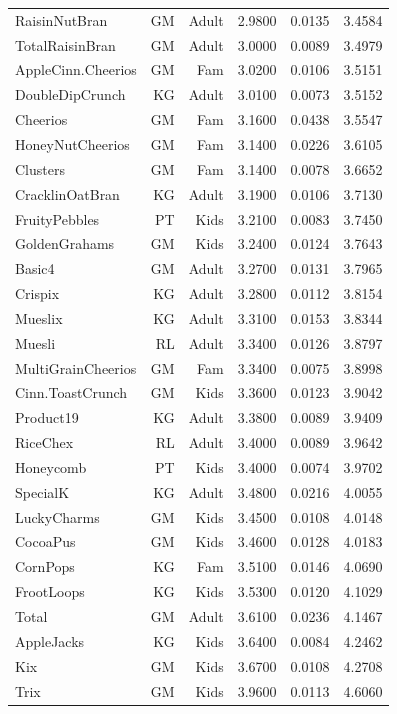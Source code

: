 \begin{longtable}{@{}lrrrrr@{}}
RaisinNutBran & GM & Adult & 2.9800 & 0.0135 & 3.4584 \\
TotalRaisinBran & GM & Adult & 3.0000 & 0.0089 & 3.4979 \\
AppleCinn.Cheerios & GM & Fam & 3.0200 & 0.0106 & 3.5151 \\
DoubleDipCrunch & KG & Adult & 3.0100 & 0.0073 & 3.5152 \\
Cheerios & GM & Fam & 3.1600 & 0.0438 & 3.5547 \\
HoneyNutCheerios & GM & Fam & 3.1400 & 0.0226 & 3.6105 \\
Clusters & GM & Fam & 3.1400 & 0.0078 & 3.6652 \\
CracklinOatBran & KG & Adult & 3.1900 & 0.0106 & 3.7130 \\
FruityPebbles & PT & Kids & 3.2100 & 0.0083 & 3.7450 \\
GoldenGrahams & GM & Kids & 3.2400 & 0.0124 & 3.7643 \\
Basic4 & GM & Adult & 3.2700 & 0.0131 & 3.7965 \\
Crispix & KG & Adult & 3.2800 & 0.0112 & 3.8154 \\
Mueslix & KG & Adult & 3.3100 & 0.0153 & 3.8344 \\
Muesli & RL & Adult & 3.3400 & 0.0126 & 3.8797 \\
MultiGrainCheerios & GM & Fam & 3.3400 & 0.0075 & 3.8998 \\
Cinn.ToastCrunch & GM & Kids & 3.3600 & 0.0123 & 3.9042 \\
Product19 & KG & Adult & 3.3800 & 0.0089 & 3.9409 \\
RiceChex & RL & Adult & 3.4000 & 0.0089 & 3.9642 \\
Honeycomb & PT & Kids & 3.4000 & 0.0074 & 3.9702 \\
SpecialK & KG & Adult & 3.4800 & 0.0216 & 4.0055 \\
LuckyCharms & GM & Kids & 3.4500 & 0.0108 & 4.0148 \\
CocoaPus & GM & Kids & 3.4600 & 0.0128 & 4.0183 \\
CornPops & KG & Fam & 3.5100 & 0.0146 & 4.0690 \\
FrootLoops & KG & Kids & 3.5300 & 0.0120 & 4.1029 \\
Total & GM & Adult & 3.6100 & 0.0236 & 4.1467 \\
AppleJacks & KG & Kids & 3.6400 & 0.0084 & 4.2462 \\
Kix & GM & Kids & 3.6700 & 0.0108 & 4.2708 \\
Trix & GM & Kids & 3.9600 & 0.0113 & 4.6060 \\
\bottomrule
\end{longtable}
\endgroup
